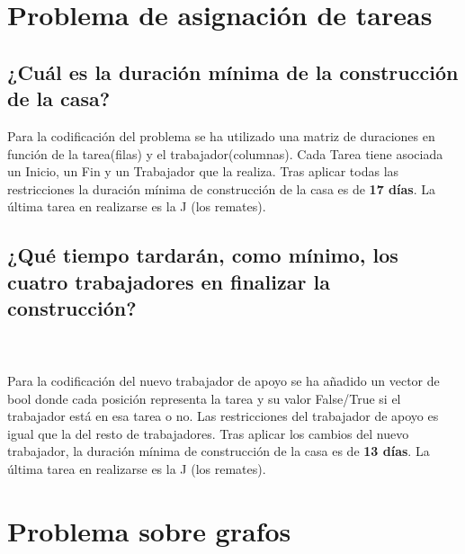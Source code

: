 \section{Problema de asignación de tareas}
\noindent{}


\subsection{¿Cuál es la duración mínima de la construcción de la casa?}
Para la codificación del problema se ha utilizado una matriz de duraciones en función de la tarea(filas) y el trabajador(columnas). Cada Tarea tiene asociada un Inicio, un Fin y un Trabajador que la realiza. 
Tras aplicar todas las restricciones la duración mínima de construcción de la casa es de \textbf{17 días}. La última tarea en realizarse es la J (los remates).



\subsection{ ¿Qué tiempo tardarán, como mínimo, los cuatro trabajadores en finalizar la construcción?}
\noindent{}
\quad \\ \quad \\
Para la codificación del nuevo trabajador de apoyo se ha añadido un vector de bool donde cada posición representa la tarea y su valor False/True si el trabajador está en esa tarea o no. Las restricciones del trabajador de apoyo es igual que la del resto de trabajadores.
Tras aplicar los cambios del nuevo trabajador, la duración mínima de construcción de la casa es de \textbf{13 días}. La última tarea en realizarse es la J (los remates).




\section{Problema sobre grafos}
\noindent{}


